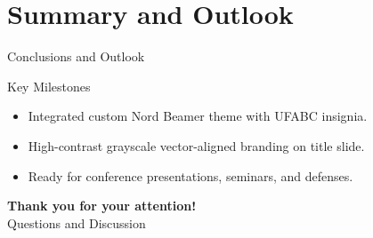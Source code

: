 \documentclass[aspectratio=169, sectionpages, codemintedoverleaf, bibref]{beamer}
\begin{document}
\section{Summary and Outlook}

\begin{frame}{Conclusions and Outlook}
  \begin{alertblock}{Key Milestones}
    \begin{itemize}
      \item Integrated custom Nord Beamer theme with UFABC insignia.
      \item High-contrast grayscale vector-aligned branding on title slide.
      \item Ready for conference presentations, seminars, and defenses.
    \end{itemize}
  \end{alertblock}
  \vfill
  \centering
  {\Large \textbf{\textcolor{nordEight}{Thank you for your attention!}}}\\[1em]
  {\small Questions and Discussion}
\end{frame}
\end{document}
